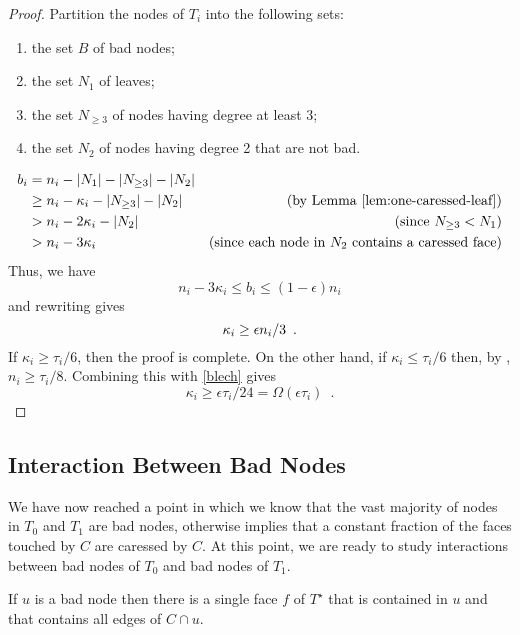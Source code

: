 \documentclass{patmorin}
\newcommand{\dual}[1]{{#1}^\star}
\begin{document}
\begin{proof}
   Partition the nodes of $T_i$ into the following sets:
   \begin{enumerate}
       \item the set $B$ of bad nodes;
       \item the set $N_1$ of leaves;
       \item the set $N_{\ge 3}$ of nodes having degree at least 3;
       \item the set $N_2$ of nodes having degree 2 that are not bad.
   \end{enumerate}
   \begin{align*}
     b_i & = n_i - |N_1|- |N_{\ge 3}|-|N_2| \\
         & \ge  n_i - \kappa_i - |N_{\ge 3}|-|N_2| 
           & \text{(by \lemref{one-caressed-leaf})} \\
          & >  n_i - 2\kappa_i -|N_2| 
           & \text{(since $N_{\ge 3} < N_1$)} \\
           & >  n_i - 3\kappa_i 
           & \text{(since each node in $N_2$ contains a caressed face)}
    \end{align*}
    Thus, we have
    \[
          n_i-3\kappa_i \le b_i \le (1-\epsilon)n_i
    \]
    and rewriting gives 
    \begin{equation}
      \kappa_i \ge \epsilon n_i/3 \enspace . \eqlabel{blech}
    \end{equation}
    If $\kappa_i \ge \tau_i/6$, then the proof is complete.  On the other hand, if $\kappa_i \le \tau_i/6$ then, by , $n_i \ge \tau_i/8$. Combining this with \eqref{blech}  gives
    \[
      \kappa_i \ge \epsilon\tau_i/24 = \Omega(\epsilon \tau_i) \enspace .
    \]
\end{proof}

\subsection{Interaction Between Bad Nodes}

We have now reached a point in which we know that the vast
majority of nodes in $T_0$ and $T_1$ are bad nodes, otherwise
 implies that a constant fraction of the
faces touched by $C$ are caressed by $C$.  At this point, we are ready
to study interactions between bad nodes of $T_0$ and bad nodes of $T_1$.


\begin{lem}
   If $u$ is a bad node then there is a single face $f$ of $\dual{T}$
   that is contained in $u$ and that contains all edges of $C\cap u$.
\end{lem}
\end{document}
